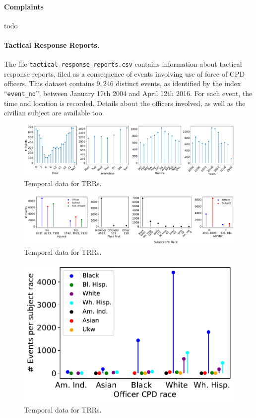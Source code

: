 \paragraph{Complaints} todo

\paragraph{Tactical Response Reports.}
The file \texttt{tactical\_response\_reports.csv} contains information about
tactical response reports, filed as a consequence of  events involving use of
force of CPD officers. This dataset contains $9{,}246$ distinct events, as
identified by the index ``\texttt{event\_no}'', between January 17th 2004 and
April 12th 2016. For each event, the time and location is recorded. Details
about the officers involved, as well as the civilian subject are available too. 

\begin{figure}[h] 
	\includegraphics[width=\textwidth]{figs/trrs_times} 
	\caption{Temporal data for TRRs.} \label{fig:trrs_times}
\end{figure}

\begin{figure}[h] 
	\includegraphics[width=\textwidth]{figs/trr_stats} 
	\caption{Temporal data for TRRs.} \label{fig:trrs_stats1}
\end{figure}

\begin{figure}[h] 
	\includegraphics[width=\textwidth]{figs/trr_stats_race_race} 
	\caption{Temporal data for TRRs.} \label{fig:trrs_stats2}
\end{figure}

